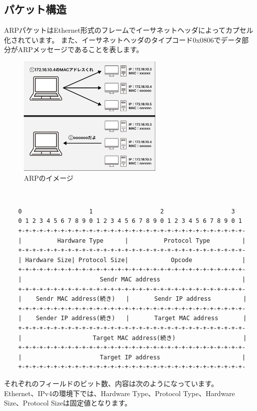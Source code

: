 \subsection{パケット構造}
ARPパケットはEthernet形式のフレームでイーサネットヘッダによってカプセル化されています。
また、イーサネットヘッダのタイプコード0x0806でデータ部分がARPメッセージであることを表します\cite{arp_format}\cite{yokuwakaru}。
\begin{figure}[H]
    \centering
    \includegraphics[width=7cm]{image/02-Body/arp_image.png}
    \caption{ARPのイメージ}
    \label{arp_image}
\end{figure}　
\begin{shaded}
    \begin{verbatim}
    0                   1                   2                   3
    0 1 2 3 4 5 6 7 8 9 0 1 2 3 4 5 6 7 8 9 0 1 2 3 4 5 6 7 8 9 0 1
    +-+-+-+-+-+-+-+-+-+-+-+-+-+-+-+-+-+-+-+-+-+-+-+-+-+-+-+-+-+-+-+-
    |          Hardware Type      |          Protocol Type         |
    +-+-+-+-+-+-+-+-+-+-+-+-+-+-+-+-+-+-+-+-+-+-+-+-+-+-+-+-+-+-+-+-
    | Hardware Size| Protocol Size|            Opcode              |
    +-+-+-+-+-+-+-+-+-+-+-+-+-+-+-+-+-+-+-+-+-+-+-+-+-+-+-+-+-+-+-+-
    |                      Sendr MAC address                       |
    +-+-+-+-+-+-+-+-+-+-+-+-+-+-+-+-+-+-+-+-+-+-+-+-+-+-+-+-+-+-+-+-
    |    Sendr MAC address(続き)   |       Sendr IP address         |
    +-+-+-+-+-+-+-+-+-+-+-+-+-+-+-+-+-+-+-+-+-+-+-+-+-+-+-+-+-+-+-+-
    |    Sender IP address(続き)   |       Target MAC address       |
    +-+-+-+-+-+-+-+-+-+-+-+-+-+-+-+-+-+-+-+-+-+-+-+-+-+-+-+-+-+-+-+-
    |                    Target MAC address(続き)                   |
    +-+-+-+-+-+-+-+-+-+-+-+-+-+-+-+-+-+-+-+-+-+-+-+-+-+-+-+-+-+-+-+-
    |                      Target IP address                       |
    +-+-+-+-+-+-+-+-+-+-+-+-+-+-+-+-+-+-+-+-+-+-+-+-+-+-+-+-+-+-+-+-
  \end{verbatim}
\end{shaded}
それぞれのフィールドのビット数、内容は次のようになっています。
Ethernet、IPv4の環境下では、Hardware Type、Protocol Type、Hardware Size、Protocol Sizeは固定値となります。

